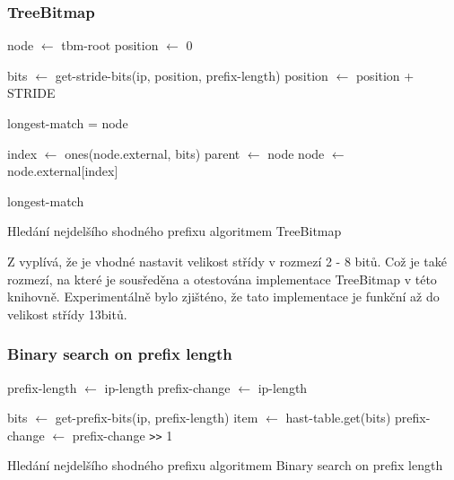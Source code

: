 \subsubsection{TreeBitmap}
\begin{algorithm}
	node $\leftarrow$ tbm-root\;
	position $\leftarrow$ 0\;
	{
		bits $\leftarrow$ get-stride-bits(ip, position, prefix-length)\;
		position $\leftarrow$ position + STRIDE\;

		{
			longest-match = node\;
		}

		index $\leftarrow$ ones(node.external, bits)\;
		parent $\leftarrow$ node\;
		node $\leftarrow$ node.external[index]\;
	}
	\Return longest-match\;
	\caption{Hledání nejdelšího shodného prefixu algoritmem TreeBitmap}
\end{algorithm}


Z \cite{tbm} vyplívá, že je vhodné nastavit velikost střídy v rozmezí 2 - 8 bitů. Což je také rozmezí,
na které je sousředěna a otestována implementace TreeBitmap v této knihovně. Experimentálně bylo zjišténo,
že tato implementace je funkční až do velikost střídy 13bitů.

\subsubsection{Binary search on prefix length}

\begin{algorithm}
	prefix-length $\leftarrow$ ip-length\;
	prefix-change $\leftarrow$ ip-length\;
	{
		bits $\leftarrow$ get-prefix-bits(ip, prefix-length)\;
		item $\leftarrow$ hast-table.get(bits)\;
		prefix-change $\leftarrow$ prefix-change \texttt{>>} 1\;

	}
	\caption{Hledání nejdelšího shodného prefixu algoritmem Binary search on prefix length}
\end{algorithm}


